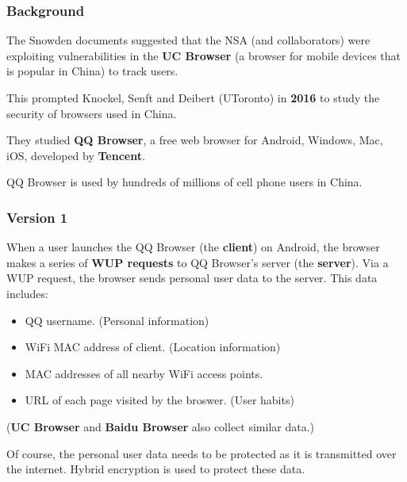 \documentclass[12pt,titlepage]{article}
\begin{document}
\subsubsection{Background}
The Snowden documents suggested that the NSA (and collaborators) were exploiting vulnerabilities in the \textbf{UC Browser} (a browser for mobile devices that is popular in China) to track users.

This prompted Knockel, Senft and Deibert (UToronto) in \textbf{2016} to study the security of browsers used in China.

They studied \textbf{QQ Browser}, a free web browser for Android, Windows, Mac, iOS, developed by \textbf{Tencent}.

QQ Browser is used by hundreds of millions of cell phone users in China.

\subsubsection{Version 1}
When a user launches the QQ Browser (the \textbf{client}) on Android, the browser makes a series of \textbf{WUP requests} to QQ Browser’s server (the \textbf{server}).
Via a WUP request, the browser sends personal user data to the server. This data includes:\begin{itemize}
	\item QQ username. (Personal information)
	\item WiFi MAC address of client. (Location information)
	\item MAC addresses of all nearby WiFi access points.
	\item URL of each page visited by the broswer. (User habits)
\end{itemize}
(\textbf{UC Browser} and \textbf{Baidu Browser} also collect similar data.)

Of course, the personal user data needs to be protected as it is transmitted over the internet. Hybrid encryption is used to protect these data. 
\end{document}
